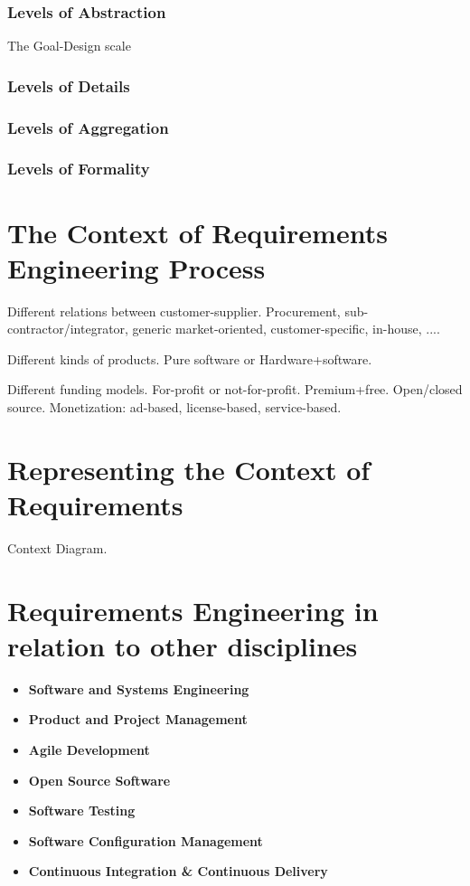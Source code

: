 \subsubsection*{Levels of Abstraction}
The Goal-Design scale

\subsubsection*{Levels of Details}

\subsubsection*{Levels of Aggregation}

\subsubsection*{Levels of Formality}

\section*{The Context of Requirements Engineering Process}

Different relations between customer-supplier. Procurement, sub-contractor/integrator, generic market-oriented, customer-specific, in-house, ....

Different kinds of products. Pure software or Hardware+software. 

Different funding models. For-profit or not-for-profit. Premium+free. Open/closed source. Monetization: ad-based, license-based, service-based.  

\section*{Representing the Context of Requirements}

Context Diagram.

\section*{Requirements Engineering in relation to other disciplines}

\begin{itemize}
  \item \textbf{Software and Systems Engineering}
  \item \textbf{Product and Project Management}
  \item \textbf{Agile Development}
  \item \textbf{Open Source Software}
  \item \textbf{Software Testing}
  \item \textbf{Software Configuration Management}
  \item \textbf{Continuous Integration \& Continuous Delivery}
\end{itemize}

